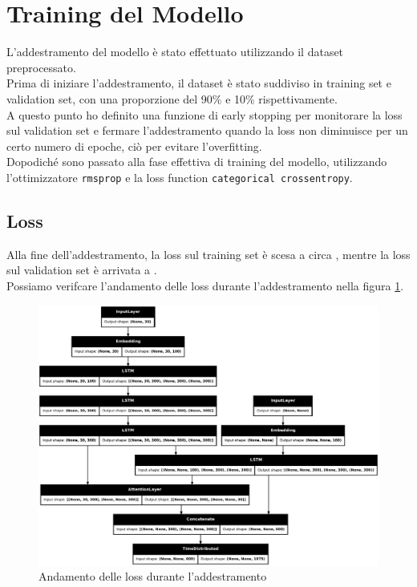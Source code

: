 \documentclass[a4paper, 12pt]{article}
\begin{document}
\section{Training del Modello}
L'addestramento del modello è stato effettuato utilizzando il dataset preprocessato.\\
Prima di iniziare l'addestramento, il dataset è stato suddiviso in training set e validation set, con una proporzione del 90\% e 10\% rispettivamente.\\
A questo punto ho definito una funzione di early stopping per monitorare la loss sul validation set e fermare l'addestramento quando la loss non diminuisce per un certo numero di epoche, ciò per evitare l'overfitting.\\
Dopodiché sono passato alla fase effettiva di training del modello, utilizzando l'ottimizzatore \texttt{rmsprop} e la loss function \texttt{categorical crossentropy}.\\

\subsection{Loss}
Alla fine dell'addestramento, la loss sul training set è scesa a circa , mentre la loss sul validation set è arrivata a .\\
Possiamo verifcare l'andamento delle loss durante l'addestramento nella figura \ref{fig:loss_plot}.
\begin{figure}[H]
    \centering
    \includegraphics[width=1\textwidth]{media/Seq2SeqLSTM_originale_image.png}
    \caption{Andamento delle loss durante l'addestramento}
    \label{fig:loss_plot}
\end{figure}
\end{document}
